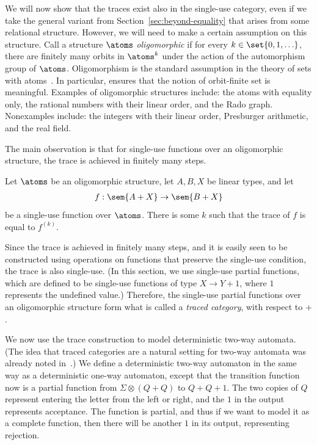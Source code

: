 We will now show that the traces exist also in the single-use category, even if we take the general variant from Section~\ref{sec:beyond-equality} that arises from some relational structure. However, we will need to make a certain assumption on this structure. Call a structure $\atoms$  \emph{oligomorphic} if for every $k \in \set{0,1,\ldots}$, there  are finitely many orbits in $\atoms^k$ under the action of the automorphism group of $\atoms$.
Oligomorphism is the standard assumption in the theory of sets with atoms~\cite{bojanczyk_slightly2018}. In particular, ensures that the notion of orbit-finite set is meaningful. Examples of oligomorphic structures include: the atoms with equality only, the rational numbers with their linear order, and the Rado graph. Nonexamples include: the integers with their linear order, Presburger arithmetic, and the real field. 



The main observation is that for single-use functions over an oligomorphic structure, the trace is achieved in finitely many steps.
\begin{lemma}\label{lem:traced-finite-iteration} Let $\atoms$ be an oligomorphic structure, let $A,B,X$ be linear types, and let 
    \begin{align*}
        f : \sem{A + X} \to \sem{B + X}
        \end{align*}
        be a single-use function over $\atoms$. There is some $k$ such that the trace of $f$ is equal to $f^{(k)}$.
\end{lemma}


Since the trace is achieved in finitely many steps, and it is easily seen to be constructed using operations on functions that preserve the single-use condition, the trace is also single-use. (In this section, we use single-use partial functions, which are defined to be single-use functions of type $X \to Y +1$, where $1$ represents the undefined value.) Therefore, the single-use partial functions over an oligomorphic structure form what is called a \emph{traced category}, with respect to $+$. 



We now use the trace construction to model deterministic two-way automata. (The idea that traced categories are a natural setting for two-way automata was already noted in~\cite{hines2003categorical}.) We define a deterministic two-way automaton in the same way as a deterministic one-way automaton, except that the transition function now is a partial function from $\Sigma \otimes (Q + Q)$ to $Q + Q + 1$. 
The two copies of $Q$ represent entering the letter from the left or right, and the $1$ in the output represents acceptance.  The function is partial, and thus if we want to model it as a complete function, then there will be another $1$ in its output, representing rejection.

